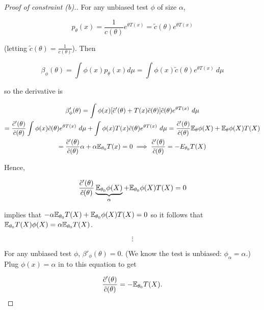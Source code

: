 \begin{proof}[Proof of constraint (b).]  For any unbiased test \(\phi\) of size \(\alpha\),



\[
p_\theta(x) = \frac{1}{c(\theta)} e^{\theta T(x)} = \tilde{c}(\theta)e^{\theta T(x)}
\]

(letting \( \tilde{c}(\theta) =  \frac{1}{c(\theta)}\)). Then 

\[
\beta_{\phi}(\theta) = \int \phi(x) p_\theta(x) d\mu = \int \phi(x) \tilde{c}(\theta) e^{\theta T(x)} \ d\mu
\]

so the derivative is

\begin{multline*}
\beta'_{\phi}(\theta) = \int \phi(x) [ \tilde{c}'(\theta) + T(x) \tilde{c}(\theta)] \tilde{c}(\theta) e^{\theta T(x)} \ d \mu
\\ = \frac{ \tilde{c}'(\theta)}{\tilde{c}(\theta)} \int \phi(x) \tilde{c}(\theta) e^{\theta T(x)} \ d\mu + \int \phi(x) T(x) \tilde{c}(\theta) e^{\theta T(x)} \ d \mu =  \frac{ \tilde{c}'(\theta)}{\tilde{c}(\theta)} \E_\theta \phi(X) + \E_\theta \phi(X) T(X)
\\ =  \frac{ \tilde{c}'(\theta)}{\tilde{c}(\theta)}  \alpha + \alpha \E_{\theta_0} T(x) = 0  \implies  \frac{ \tilde{c}'(\theta)}{\tilde{c}(\theta)}  = -E_{\theta_0} T(X)
\end{multline*}

Hence,

\[
 \frac{ \tilde{c}'(\theta)}{\tilde{c}(\theta)}  \underbrace{\E_{\theta_0}\phi(X)}_{\alpha} + \E_{\theta_0} \phi(X) T(X) = 0 
\]

implies that \(- \alpha \E_{\theta_0} T(X) + \E_{\theta_0} \phi(X) T(X) = 0 \) so it follows that \(\E_{\theta_0} T(X) \phi(X) = \alpha \E_{\theta_0} T(X)\). 

\[
\vdots
\]


For any unbiased test \(\phi\), \(\beta'_{\phi}(\theta) = 0\). (We know the test is unbiased: \(\phi_\alpha = \alpha\).) Plug \(\phi(x) = \alpha\) in to this equation to get 

\[
\frac{\tilde{c}'(\theta)}{\tilde{c}(\theta)} = -\E_{\theta_0} T(X).
\]

\end{proof}

